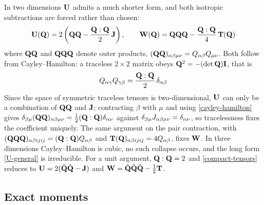 \documentclass[a5paper]{article}
\begin{document}
In two dimensions $\mathbf{U}$ admits a much shorter form, and both isotropic subtractions are forced rather than chosen:
\begin{align}
    \label{compact-tensors}
    \mathbf{U}(\mathbf{Q}) = 2\left(\mathbf{Q}\mathbf{Q} - \frac{\mathbf{Q}:\mathbf{Q}}{2}\,\mathbf{J}\right),
    \qquad
    \mathbf{W}(\mathbf{Q}) = \mathbf{Q}\mathbf{Q}\mathbf{Q} - \frac{\mathbf{Q}:\mathbf{Q}}{4}\, \mathbf{T}(\mathbf{Q})
\end{align}
where $\mathbf{Q}\mathbf{Q}$ and $\mathbf{Q}\mathbf{Q}\mathbf{Q}$ denote outer products, $(\mathbf{Q}\mathbf{Q})_{\alpha\beta\mu\nu} = Q_{\alpha\beta} Q_{\mu\nu}$. Both follow from Cayley--Hamilton: a traceless $2\times2$ matrix obeys $\mathbf{Q}^2 = -(\det\mathbf{Q})\mathbf{I}$, that is
\begin{align}
    \label{cayley-hamilton}
    Q_{\alpha\gamma}Q_{\gamma\beta} = \frac{\mathbf{Q}:\mathbf{Q}}{2}\, \delta_{\alpha\beta}
\end{align}
Since the space of symmetric traceless tensors is two-dimensional, $\mathbf{U}$ can only be a combination of $\mathbf{Q}\mathbf{Q}$ and $\mathbf{J}$; contracting $\beta$ with $\mu$ and using \eqref{cayley-hamilton} gives $\delta_{\beta\mu}(\mathbf{Q}\mathbf{Q})_{\alpha\beta\mu\nu} = \tfrac{1}{2}(\mathbf{Q}:\mathbf{Q})\delta_{\alpha\nu}$ against $\delta_{\beta\mu}J_{\alpha\beta\mu\nu} = \delta_{\alpha\nu}$, so tracelessness fixes the coefficient uniquely. The same argument on the pair contraction, with $(\mathbf{Q}\mathbf{Q}\mathbf{Q})_{{\alpha\beta} ijij} = (\mathbf{Q}:\mathbf{Q})Q_{\alpha\beta}$ and $\mathbf{T}(\mathbf{Q})_{{\alpha\beta} ijij} = 4Q_{\alpha\beta}$, fixes $\mathbf{W}$. In three dimensions Cayley--Hamilton is cubic, no such collapse occurs, and the long form \eqref{U-general} is irreducible. For a unit argument, $\mathbf{Q}:\mathbf{Q} = 2$ and \eqref{compact-tensors} reduces to $\mathbf{U} = 2(\hat{\mathbf{Q}}\hat{\mathbf{Q}} - \mathbf{J})$ and $\mathbf{W} = \hat{\mathbf{Q}}\hat{\mathbf{Q}}\hat{\mathbf{Q}} - \tfrac12\mathbf{T}$.

\subsection{Exact moments}
\label{sec-exact-moments}
\end{document}
